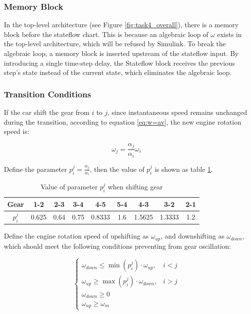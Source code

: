 \documentclass[12pt]{article}
\begin{document}
\subsubsection{Memory Block}

In the top-level architecture (see Figure \ref{fig:task4_overall}), there is a memory block before the stateflow chart. This is because an algebraic loop of $\omega$ exists in the top-level architecture, which will be refused by Simulink. To break the algebraic loop, a memory block is inserted upstream of the stateflow input. By introducing a single time-step delay, the Stateflow block receives the previous step's state instead of the current state, which eliminates the algebraic loop.

\subsubsection{Transition Conditions}

If the car shift the gear from $i$ to $j$, since instantaneous speed remains unchanged during the transition, according to equation \ref{eq:w=av}, the new engine rotation speed is:

\begin{equation}
    \omega_j = \frac{\alpha_j}{\alpha_i}\omega_i
    \label{eq:new_omega}
\end{equation}

Define the parameter $p^j_i=\frac{\alpha_j}{\alpha_i}$, then the value of $p^j_i$ is shown as table \ref{tab:p_shift}.

\begin{table}[htbp]
    \centering
    \begin{tabular}{c|cccc|cccc}
    \hline
        Gear & 1-2 & 2-3 & 3-4 & 4-5 & 5-4 & 4-3 & 3-2 & 2-1 \\ 
    \hline
        $p^j_i$ & 0.625 & 0.64 & 0.75 & 0.8333 & 1.6 & 1.5625 & 1.3333 & 1.2 \\
    \hline
    \end{tabular}
    \caption{Value of parameter $p^j_i$ when shifting gear}
    \label{tab:p_shift}
\end{table}

Define the engine rotation speed of upshifting as $\omega_{up}$, and downshifting as $\omega_{down}$, which should meet the following conditions preventing from gear oscillation:

\begin{equation}
    \begin{cases}
    \omega_{down} \le \min(p^j_i) \cdot \omega_{up}, & i < j \\
    \omega_{up} \ge \max(p^j_i) \cdot \omega_{down}, & i > j \\
    \omega_{down} \ge 0 \\
    \omega_{up} \ge \omega_m
    \end{cases}
    \label{eq:task4_w}
\end{equation}
\end{document}
